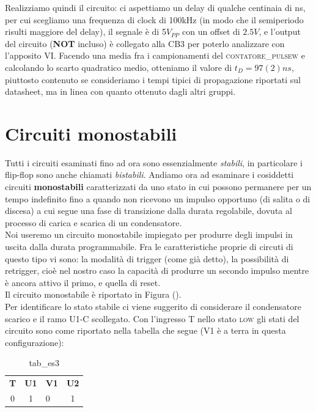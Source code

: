 \documentclass[journal, a4paper]{IEEEtran}
\begin{document}
  
Realizziamo quindi il circuito: ci aspettiamo un delay di qualche centinaia di ns, per cui scegliamo una frequenza di clock di 100kHz (in modo che il semiperiodo risulti maggiore del delay), il segnale è di 5$V_{PP}$ con un offset di $2.5V$, e l'output del circuito (\textbf{NOT} incluso) è collegato alla \textsc{CB3} per poterlo analizzare con l'apposito VI. Facendo una media fra i campionamenti del \textsc{contatore\_pulsew} e calcolando lo scarto quadratico medio, otteniamo il valore di $t_D = 97(2) ns$, piuttosto contenuto se consideriamo i tempi tipici di propagazione riportati sul datasheet, ma in linea con quanto ottenuto dagli altri gruppi.

\section{Circuiti monostabili}
Tutti i circuiti esaminati fino ad ora sono essenzialmente \textit{stabili}, in particolare i flip-flop sono anche chiamati \textit{bistabili}. Andiamo ora ad esaminare i cosiddetti circuiti \textbf{monostabili} caratterizzati da uno stato in cui possono permanere per un tempo indefinito fino a quando non ricevono un impulso opportuno (di salita o di discesa) a cui segue una fase di transizione dalla durata regolabile, dovuta al processo di carica e scarica di un condensatore. \\
Noi useremo un circuito monostabile impiegato per produrre degli impulsi in uscita dalla durata programmabile. Fra le caratteristiche proprie di circuti di questo tipo vi sono: la modalità di trigger (come già detto), la possibilità di retrigger, cioè nel nostro caso la capacità di produrre un secondo impulso mentre è ancora attivo il primo, e quella di reset.\\
Il circuito monostabile è riportato in Figura ().\\

Per identificare lo stato stabile ci viene suggerito di considerare il condensatore scarico e il ramo U1-C scollegato. Con l'ingresso T nello stato \textsc{low} gli stati del circuito sono come riportato nella tabella che segue (V1 è a terra in questa configurazione):\\


\begin{table}
\centering
\caption{tab\_es3}
\label{tab:es3}
\begin{tabular}{c|cl|c}
  \hline
  \textbf{T} & \textbf{U1} & \textbf{V1} & \textbf{U2} \\
  0 & 1 & 0 & 1
\end{tabular}
\end{table}
~\\
\end{document}
